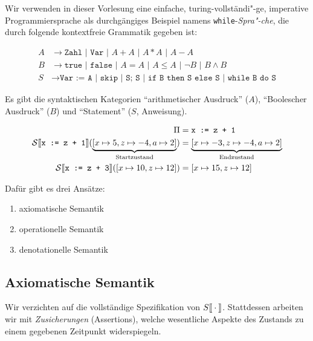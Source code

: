 \begin{definition}
    Wir verwenden in dieser Vorlesung eine einfache, turing-vollständi"-ge, imperative Programmiersprache als durchgängiges Beispiel namens \texttt{while}-\emph{Spra"-che}, die durch folgende kontextfreie Grammatik gegeben ist:
\end{definition}
\vspace*{-2em}
\begin{align*}
    A & \to \texttt{Zahl | Var | $A + A$ | $A * A$ | $A - A$} \\
    B & \to \texttt{true | false | $A = A$ | $A \leq A$ | $\neg B$ | $B \wedge B$} \\
    S & \to \texttt{Var := A | skip | S; S | if B then S else S | while B do S}
\end{align*}
\begin{remark}
    Es gibt die syntaktischen Kategorien ``arithmetischer Ausdruck'' ($A$), ``Boolescher Ausdruck'' ($B$) und ``Statement'' ($S$, Anweisung).
\end{remark}

\begin{example}
    \begin{align*}
        \Pi & = \texttt{x := z + 1} \\
        \mathcal{S}\mathrm{[}\kern-.14em\mathrm{[}\texttt{x := z + 1}\mathrm{]}\kern-.14em\mathrm{]}(\underbrace{[x \mapsto 5, z \mapsto -4, a \mapsto 2]}_{\text{Startzustand}}) & = \underbrace{[x \mapsto -3, z \mapsto -4, a \mapsto 2]}_{\text{Endzustand}} \\
        \mathcal{S}\mathrm{[}\kern-.14em\mathrm{[}\texttt{x := z + 3}\mathrm{]}\kern-.14em\mathrm{]}([x \mapsto 10, z \mapsto 12]) & = [x \mapsto 15, z \mapsto 12]
    \end{align*}
\end{example}



Dafür gibt es drei Ansätze:
\begin{enumerate}
    \item axiomatische Semantik
    \item operationelle Semantik
    \item denotationelle Semantik
\end{enumerate}


\subsection{Axiomatische Semantik}

Wir verzichten auf die vollständige Spezifikation von $S\mathrm{[}\kern-.14em\mathrm{[}\cdot\mathrm{]}\kern-.14em\mathrm{]}$. Stattdessen arbeiten wir mit \emph{Zusicherungen} (Assertions), welche wesentliche Aspekte des Zustands zu einem gegebenen Zeitpunkt widerspiegeln.

